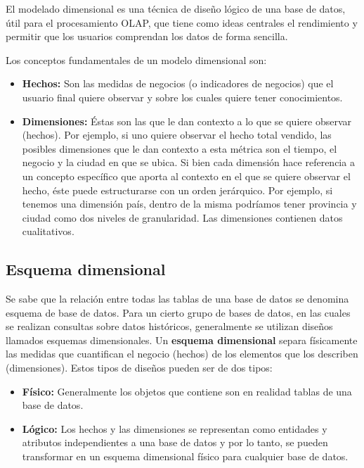 \documentclass[a4paper,11pt]{article}
\begin{document}
\begin{flushleft}
    El modelado dimensional es una técnica de diseño lógico de una base de datos, útil para el procesamiento OLAP, que tiene como ideas centrales el
    rendimiento y permitir que los usuarios comprendan los datos de forma sencilla.\par 
    
    Los conceptos fundamentales de un modelo dimensional son:
    
    \begin{itemize}
      \item \textbf{Hechos:} Son las medidas de negocios (o indicadores de negocios) que el usuario final quiere observar y sobre los cuales quiere tener
      conocimientos.
      \item \textbf{Dimensiones:} Éstas son las que le dan contexto a lo que se quiere observar (hechos). Por ejemplo, si uno quiere observar el hecho total 
      vendido, las posibles dimensiones que le dan contexto a esta métrica son el tiempo, el negocio y la ciudad en que se ubica. Si bien cada dimensión hace
      referencia a un concepto específico que aporta al contexto en el que se quiere observar el hecho, éste puede estructurarse con un orden jerárquico.
      Por ejemplo, si tenemos una dimensión país, dentro de la misma podríamos tener provincia y ciudad como dos niveles de granularidad. Las dimensiones 
      contienen datos cualitativos.
    \end{itemize}
    
    
    \subsection{Esquema dimensional}
    
    Se sabe que la relación entre todas las tablas de una base de datos se denomina esquema de base de datos. Para un cierto grupo de bases de datos, en las
    cuales se realizan consultas sobre datos históricos, generalmente se utilizan diseños llamados esquemas dimensionales. Un \textbf{esquema dimensional}
    separa físicamente las medidas que cuantifican el negocio (hechos) de los elementos que los describen (dimensiones). Estos tipos de diseños pueden ser de
    dos tipos:\par
    
    \begin{itemize}
      \item \textbf{Físico:} Generalmente los objetos que contiene son en realidad tablas de una base de datos.
      \item \textbf{Lógico:} Los hechos y las dimensiones se representan como entidades y atributos independientes a una base de datos y por lo tanto,
      se pueden transformar en un esquema dimensional físico para cualquier base de datos.
    \end{itemize}
    

\end{flushleft}
\end{document}
